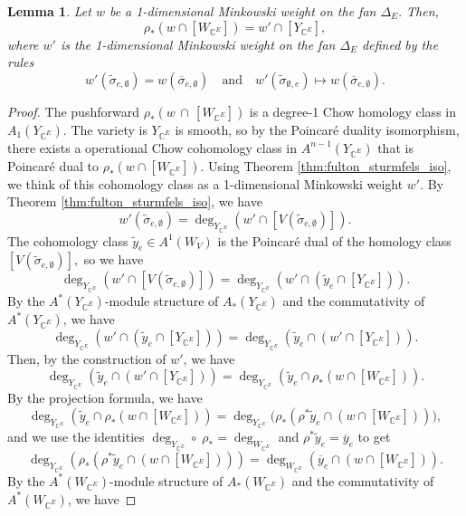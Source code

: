 \documentclass{amsart}
\theoremstyle{plain}
\newtheorem{lemma}[theorem]{Lemma}
\theoremstyle{definition}
\begin{document}
\begin{lemma}
\label{lem:pushforward_weight}
Let $w$ be a 1-dimensional Minkowski weight on the fan $\Delta_E.$ Then,
\[\rho_*(w \cap [W_{\mathbb{C}^E}]) = w' \cap [Y_{\mathbb{C}^E}],\]
where $w'$ is the 1-dimensional Minkowski weight on the fan $\Delta_E$ defined by the rules
\[w'(\tilde{\sigma}_{e, \emptyset}) = w(\overline{\sigma}_{e,\emptyset}) \quad \text{and} \quad w'(\tilde{\sigma}_{\emptyset, e}) \mapsto w(\overline{\sigma}_{e,\emptyset}).\]
\end{lemma}
\begin{proof}
The pushforward $\rho_*(w \, \cap \, [W_{\mathbb{C}^E}])$ is a degree-1 Chow homology class in $A_1(Y_{\mathbb{C}^E}).$ The variety is $Y_{\mathbb{C}^E}$ is smooth, so by  the Poincar\'e duality isomorphism, there exists a operational Chow cohomology class in $A^{n-1}(Y_{\mathbb{C}^E})$ that is Poincar\'e dual to $\rho_*(w \cap [W_{\mathbb{C}^E}])$. Using Theorem \ref{thm:fulton_sturmfels_iso}, we think of this cohomology class as a 1-dimensional Minkowski weight $w'.$ By Theorem \ref{thm:fulton_sturmfels_iso}, we have
\[w'(\tilde{\sigma}_{e, \emptyset}) = \deg_{Y_{\mathbb{C}^E}}(w' \cap [V(\tilde{\sigma}_{e, \emptyset})]).\]
The cohomology class $\tilde{y}_e \in A^1(W_V)$ is the Poincar\'e dual of the homology class $[V(\tilde{\sigma}_{e, \emptyset})],$ so we have
\[\deg_{Y_{\mathbb{C}^E}}(w' \cap [V(\tilde{\sigma}_{e, \emptyset})]) = \deg_{Y_{\mathbb{C}^E}}(w' \cap ( \tilde{y}_e \cap [Y_{\mathbb{C}^E}])).\]
By the $A^*(Y_{\mathbb{C}^E})$-module structure of $A_*(Y_{\mathbb{C}^E})$ and the commutativity of $A^*(Y_{\mathbb{C}^E})$, we have
\[\deg_{Y_{\mathbb{C}^E}}(w' \cap ( \tilde{y}_e \cap [Y_{\mathbb{C}^E}])) =
\deg_{Y_{\mathbb{C}^E}}(\tilde{y}_e \cap ( w' \cap [Y_{\mathbb{C}^E}])).\]
Then, by the construction of $w'$, we have
\[\deg_{Y_{\mathbb{C}^E}}(\tilde{y}_e \cap ( w' \cap [Y_{\mathbb{C}^E}])) = \deg_{Y_{\mathbb{C}^E}}(\tilde{y}_e \cap  \rho_*(w \cap [W_{\mathbb{C}^E}])).\]
By the projection formula, we have
\[\deg_{Y_{\mathbb{C}^E}}(\tilde{y}_e \cap  \rho_*(w \cap [W_{\mathbb{C}^E}])) = \deg_{Y_{\mathbb{C}^E}}\big(\rho_*(\rho^*\tilde{y}_e \cap  (w \cap [W_{\mathbb{C}^E}]))\big),\]
and we use the identities $\deg_{Y_{\mathbb{C}^E}} \circ \; \rho_* = \deg_{W_{\mathbb{C}^E}}$ and $\rho^*\tilde{y}_e = \overline{y}_e$ to get
\[\deg_{Y_{\mathbb{C}^E}}(\rho_*(\rho^*\tilde{y}_e \cap  (w \cap [W_{\mathbb{C}^E}]))) = \deg_{W_{\mathbb{C}^E}}(\overline{y}_e \cap  (w \cap [W_{\mathbb{C}^E}])).\]
By the $A^*(W_{\mathbb{C}^E})$-module structure of $A_*(W_{\mathbb{C}^E})$ and the commutativity of $A^*(W_{\mathbb{C}^E})$, we have

\end{proof}
\end{document}
